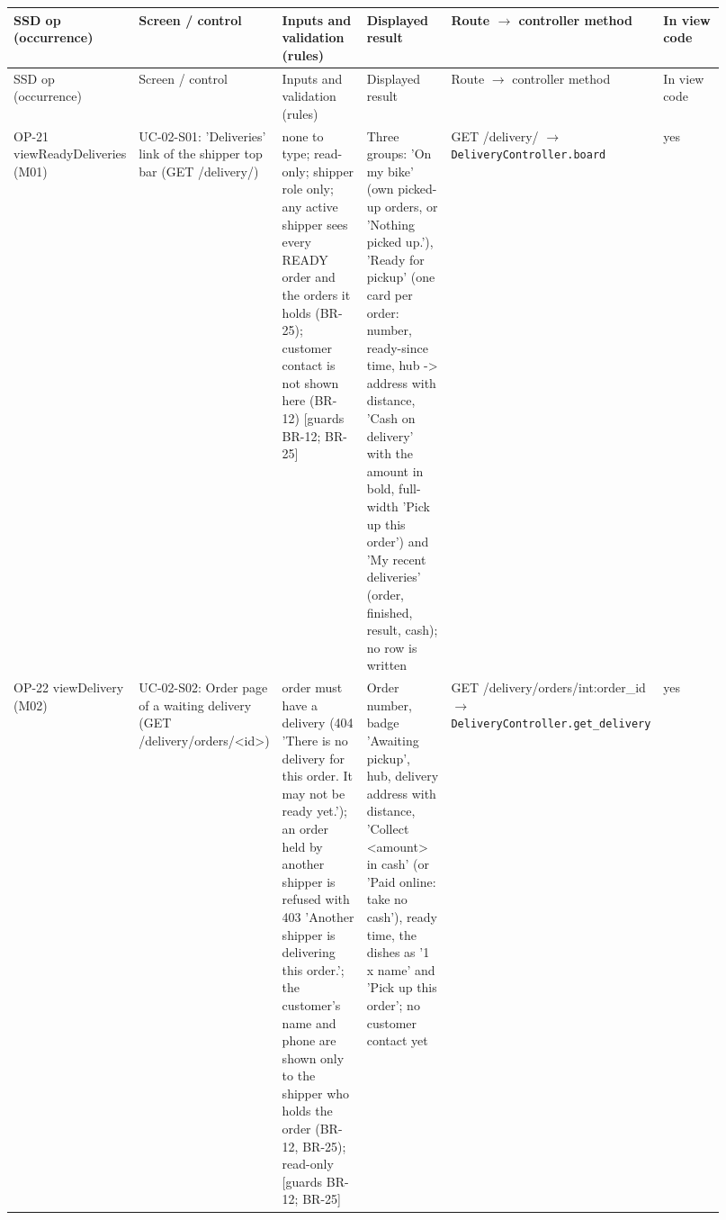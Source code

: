 \begingroup\footnotesize
\begin{longtable}{>{\raggedright\arraybackslash}p{0.1533\linewidth}>{\raggedright\arraybackslash}p{0.1533\linewidth}>{\raggedright\arraybackslash}p{0.1533\linewidth}>{\raggedright\arraybackslash}p{0.1533\linewidth}>{\raggedright\arraybackslash}p{0.1533\linewidth}>{\raggedright\arraybackslash}p{0.1533\linewidth}}
SSD op (occurrence) & Screen / control & Inputs and validation (rules) & Displayed result & Route \ensuremath{\rightarrow} controller method & In view code \\
\hline\endfirsthead
SSD op (occurrence) & Screen / control & Inputs and validation (rules) & Displayed result & Route \ensuremath{\rightarrow} controller method & In view code \\
\hline\endhead
OP-21 viewReadyDeliveries (M01) & UC-02-S01: 'Deliveries' link of the shipper top bar (GET /delivery/) & none to type; read-only; shipper role only; any active shipper sees every READY order and the orders it holds (BR-25); customer contact is not shown here (BR-12) [guards BR-12; BR-25] & Three groups: 'On my bike' (own picked-up orders, or 'Nothing picked up.'), 'Ready for pickup' (one card per order: number, ready-since time, hub -\textgreater{} address with distance, 'Cash on delivery' with the amount in bold, full-width 'Pick up this order') and 'My recent deliveries' (order, finished, result, cash); no row is written & GET /delivery/ \ensuremath{\rightarrow} \texttt{DeliveryController.\allowbreak{}board} & yes \\
OP-22 viewDelivery (M02) & UC-02-S02: Order page of a waiting delivery (GET /delivery/orders/\textless{}id\textgreater{}) & order must have a delivery (404 'There is no delivery for this order. It may not be ready yet.'); an order held by another shipper is refused with 403 'Another shipper is delivering this order.'; the customer's name and phone are shown only to the shipper who holds the order (BR-12, BR-25); read-only [guards BR-12; BR-25] & Order number, badge 'Awaiting pickup', hub, delivery address with distance, 'Collect \textless{}amount\textgreater{} in cash' (or 'Paid online: take no cash'), ready time, the dishes as '1 x name' and 'Pick up this order'; no customer contact yet & GET /delivery/orders/int:order\_id \ensuremath{\rightarrow} \texttt{DeliveryController.\allowbreak{}get\_\allowbreak{}delivery} & yes \\

\end{longtable}
